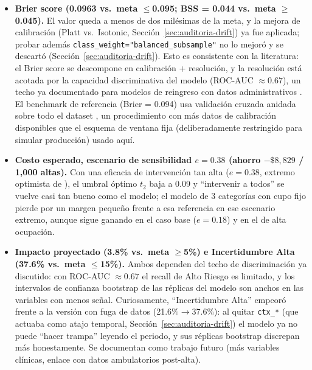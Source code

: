 \documentclass[11pt,a4paper]{article}
\begin{document}
\begin{itemize}[leftmargin=*]
\item \textbf{Brier score (0.0963 vs.\ meta $\leq$0.095; BSS = 0.044 vs.\ meta $\geq$0.045).} El valor queda a menos de dos milésimas de la meta, y la mejora de calibración (Platt vs.\ Isotonic, Sección~\ref{sec:auditoria-drift}) ya fue aplicada; probar además \texttt{class\_weight="balanced\_subsample"} no lo mejoró y se descartó (Sección~\ref{sec:auditoria-drift}). Esto es consistente con la literatura: el Brier score se descompone en calibración + resolución, y la resolución está acotada por la capacidad discriminativa del modelo (ROC-AUC $\approx 0.67$), un techo ya documentado para modelos de reingreso con datos administrativos \cite{kansagara2011,emijohnson2025}. El benchmark de referencia (Brier = 0.094) usa validación cruzada anidada sobre todo el dataset \cite{salim2026}, un procedimiento con más datos de calibración disponibles que el esquema de ventana fija (deliberadamente restringido para simular producción) usado aquí.
\item \textbf{Costo esperado, escenario de sensibilidad $e=0.38$ (ahorro $-\$8{,}829$ / 1{,}000 altas).} Con una eficacia de intervención tan alta ($e=0.38$, extremo optimista de \cite{drincic2017}), el umbral óptimo $t_2$ baja a 0.09 y ``intervenir a todos'' se vuelve casi tan bueno como el modelo; el modelo de 3 categorías con cupo fijo pierde por un margen pequeño frente a esa referencia en ese escenario extremo, aunque sigue ganando en el caso base ($e=0.18$) y en el de alta ocupación.
\item \textbf{Impacto proyectado (3.8\% vs.\ meta $\geq$5\%) e Incertidumbre Alta (37.6\% vs.\ meta $\leq$15\%).} Ambos dependen del techo de discriminación ya discutido: con ROC-AUC $\approx 0.67$ el recall de Alto Riesgo es limitado, y los intervalos de confianza bootstrap de las réplicas del modelo son anchos en las variables con menos señal. Curiosamente, ``Incertidumbre Alta'' empeoró frente a la versión con fuga de datos (21.6\%$\to$37.6\%): al quitar \texttt{ctx\_*} (que actuaba como atajo temporal, Sección~\ref{sec:auditoria-drift}) el modelo ya no puede ``hacer trampa'' leyendo el periodo, y sus réplicas bootstrap discrepan más honestamente. Se documentan como trabajo futuro (más variables clínicas, enlace con datos ambulatorios post-alta).

\end{itemize}
\end{document}
